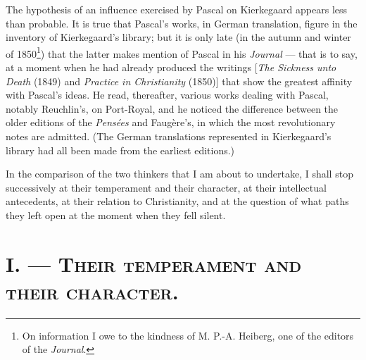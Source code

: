 \documentclass[12pt,a4paper]{article}
\begin{document}
The hypothesis of an influence exercised by Pascal on Kierkegaard appears less
than probable. It is true that Pascal's works, in German translation, figure in
the inventory of Kierkegaard's library; but it is only late (in the autumn and
winter of 1850\footnote{On information I owe to the kindness of M. P.-A.
Heiberg, one of the editors of the \emph{Journal}.}) that the latter makes
mention of Pascal in his
\emph{Journal} --- that is to say, at a moment when he had already produced the
writings [\emph{The Sickness unto Death} (1849) and \emph{Practice in
Christianity} (1850)] that show the greatest affinity with Pascal's ideas. He
read, thereafter, various works dealing with Pascal, notably Reuchlin's, on
Port-Royal, and he noticed the difference between the older editions of the
\emph{Pensées} and Faugère's, in which the most revolutionary notes are
admitted. (The German translations represented in Kierkegaard's library had all
been made from the earliest editions.)

In the comparison of the two thinkers that I am about to undertake, I shall
stop successively at their temperament and their character, at their
intellectual antecedents, at their relation to Christianity, and at the
question of what paths they left open at the moment when they fell silent.

\section*{I. --- \textsc{Their temperament and their character.}}
\end{document}
